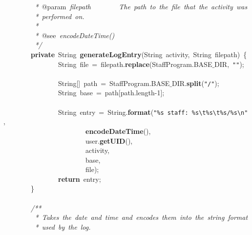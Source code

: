 \mbox{}\textit{\ \ \ \ \ \ \ \ \ *\ }@param\textit{\ filepath\ \ \ \ \ \ \ \ The\ path\ to\ the\ file\ that\ the\ activity\ was} \\
\mbox{}\textit{\ \ \ \ \ \ \ \ \ *\ performed\ on.} \\
\mbox{}\textit{\ \ \ \ \ \ \ \ \ *} \\
\mbox{}\textit{\ \ \ \ \ \ \ \ \ *\ }@see\textit{\ encodeDateTime()} \\
\mbox{}\textit{\ \ \ \ \ \ \ \ \ */} \\
\mbox{}\ \ \ \ \ \ \ \ \textbf{private}\ String\ \textbf{generateLogEntry}(String\ activity,\ String\ filepath)\ \{ \\
\mbox{}\ \ \ \ \ \ \ \ \ \ \ \ \ \ \ \ String\ file\ =\ filepath.\textbf{replace}(StaffProgram.BASE$\_$DIR,\ \texttt{"{}"{}}); \\
\mbox{} \\
\mbox{}\ \ \ \ \ \ \ \ \ \ \ \ \ \ \ \ String[]\ path\ =\ StaffProgram.BASE$\_$DIR.\textbf{split}(\texttt{"{}/"{}}); \\
\mbox{}\ \ \ \ \ \ \ \ \ \ \ \ \ \ \ \ String\ base\ =\ path[path.length-1]; \\
\mbox{} \\
\mbox{}\ \ \ \ \ \ \ \ \ \ \ \ \ \ \ \ String\ entry\ =\ String.\textbf{format}(\texttt{"{}\%s\ staff:\ \%s}\texttt{\textbackslash{}t}\texttt{\%s}\texttt{\textbackslash{}t}\texttt{\%s/\%s}\texttt{\textbackslash{}n}\texttt{"{}},\  \\
\mbox{}\ \ \ \ \ \ \ \ \ \ \ \ \ \ \ \ \ \ \ \ \ \ \ \ \textbf{encodeDateTime}(),\  \\
\mbox{}\ \ \ \ \ \ \ \ \ \ \ \ \ \ \ \ \ \ \ \ \ \ \ \ user.\textbf{getUID}(),\  \\
\mbox{}\ \ \ \ \ \ \ \ \ \ \ \ \ \ \ \ \ \ \ \ \ \ \ \ activity,\  \\
\mbox{}\ \ \ \ \ \ \ \ \ \ \ \ \ \ \ \ \ \ \ \ \ \ \ \ base, \\
\mbox{}\ \ \ \ \ \ \ \ \ \ \ \ \ \ \ \ \ \ \ \ \ \ \ \ file); \\
\mbox{}\ \ \ \ \ \ \ \ \ \ \ \ \ \ \ \ \textbf{return}\ entry; \\
\mbox{}\ \ \ \ \ \ \ \ \} \\
\mbox{}\ \ \ \ \ \ \ \  \\
\mbox{}\ \ \ \ \ \ \ \ \textit{/**} \\
\mbox{}\textit{\ \ \ \ \ \ \ \ \ *\ Takes\ the\ date\ and\ time\ and\ encodes\ them\ into\ the\ string\ format} \\
\mbox{}\textit{\ \ \ \ \ \ \ \ \ *\ used\ by\ the\ log.} \\
